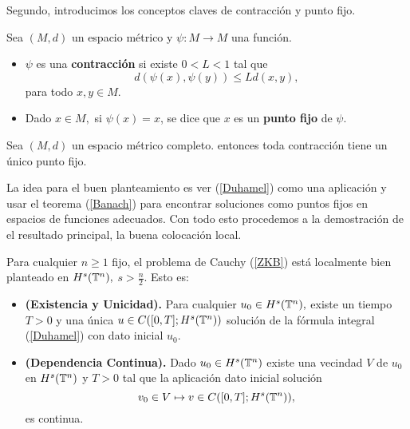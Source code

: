 Segundo, introducimos los conceptos claves de contracción y punto fijo. 
\begin{definition}Sea $(M,d)$ un espacio métrico y $\psi:M\to M$ una función.
    \begin{itemize}
        \item $\psi$ es una \textbf{contracción} si existe $0<L<1$ tal que
        $$d(\psi(x),\psi(y))\leq Ld(x,y),$$
        para todo $x,y\in M.$
        \item Dado $x\in M,$ si $\psi(x)=x$, se dice que $x$ es un \textbf{punto fijo} de $\psi.$
    \end{itemize}
\end{definition}
\begin{theorem}\label{Banach}
Sea $(M,d)$ un espacio métrico completo. entonces toda contracción tiene un único punto fijo.   
\end{theorem}
La idea para el buen planteamiento es ver (\ref{Duhamel}) como una aplicación y usar el teorema (\ref{Banach}) para encontrar soluciones como puntos fijos en espacios de funciones adecuados. Con todo esto procedemos a la demostración de el resultado principal, la buena colocación local.
\begin{theorem}
    Para cualquier $n\geq 1$ fijo, el problema de Cauchy (\ref{ZKB}) está localmente bien planteado en $H^s(\mathbb{T}^n),$ $s>\frac{n}{2}.$ Esto es:
    \begin{itemize}
        \item \textbf{(Existencia y Unicidad).} Para cualquier $u_0\in H^s(\mathbb{T}^n),$ existe un tiempo $T>0$ y una única $u\in C([0,T];H^s(\mathbb{T}^n))$ solución de la fórmula integral (\ref{Duhamel}) con dato inicial $u_0.$
        \item \textbf{(Dependencia Continua).} Dado $u_0\in H^s(\mathbb{T}^n)$ existe una vecindad $V$ de $u_0$ en $H^s(\mathbb{T}^n)$ y $T>0$ tal que la aplicación dato inicial solución 
        $$v_0\in V\mapsto v\in C([0,T];H^s(\mathbb{T}^n)), $$ 
        es continua. 
    \end{itemize}
\end{theorem}
